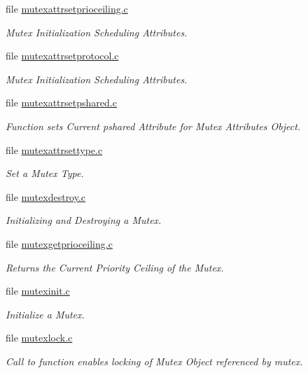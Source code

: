 \begin{DoxyCompactItemize}
file \mbox{\hyperlink{mutexattrsetprioceiling_8c}{mutexattrsetprioceiling.\+c}}
\begin{DoxyCompactList}\small\item\em Mutex Initialization Scheduling Attributes. \end{DoxyCompactList}\item 
file \mbox{\hyperlink{mutexattrsetprotocol_8c}{mutexattrsetprotocol.\+c}}
\begin{DoxyCompactList}\small\item\em Mutex Initialization Scheduling Attributes. \end{DoxyCompactList}\item 
file \mbox{\hyperlink{mutexattrsetpshared_8c}{mutexattrsetpshared.\+c}}
\begin{DoxyCompactList}\small\item\em Function sets Current pshared Attribute for Mutex Attributes Object. \end{DoxyCompactList}\item 
file \mbox{\hyperlink{mutexattrsettype_8c}{mutexattrsettype.\+c}}
\begin{DoxyCompactList}\small\item\em Set a Mutex Type. \end{DoxyCompactList}\item 
file \mbox{\hyperlink{mutexdestroy_8c}{mutexdestroy.\+c}}
\begin{DoxyCompactList}\small\item\em Initializing and Destroying a Mutex. \end{DoxyCompactList}\item 
file \mbox{\hyperlink{mutexgetprioceiling_8c}{mutexgetprioceiling.\+c}}
\begin{DoxyCompactList}\small\item\em Returns the Current Priority Ceiling of the Mutex. \end{DoxyCompactList}\item 
file \mbox{\hyperlink{mutexinit_8c}{mutexinit.\+c}}
\begin{DoxyCompactList}\small\item\em Initialize a Mutex. \end{DoxyCompactList}\item 
file \mbox{\hyperlink{mutexlock_8c}{mutexlock.\+c}}
\begin{DoxyCompactList}\small\item\em Call to function enables locking of Mutex Object referenced by mutex. \end{DoxyCompactList}\item 

\end{DoxyCompactItemize}

